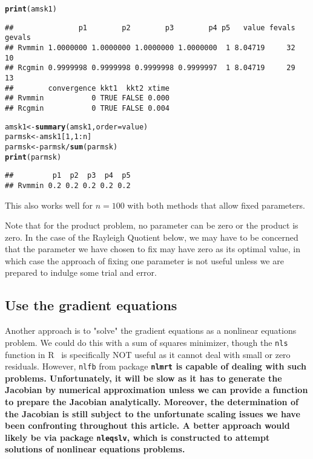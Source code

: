 \documentclass[11pt]{article}\usepackage[]{graphicx}\usepackage[]{color}
\makeatletter
\newcommand{\hlnum}[1]{\textcolor[rgb]{0.686,0.059,0.569}{#1}}%
\newcommand{\hlopt}[1]{\textcolor[rgb]{0,0,0}{#1}}%
\newcommand{\hlstd}[1]{\textcolor[rgb]{0.345,0.345,0.345}{#1}}%
\newcommand{\hlkwb}[1]{\textcolor[rgb]{0.69,0.353,0.396}{#1}}%
\newcommand{\hlkwc}[1]{\textcolor[rgb]{0.333,0.667,0.333}{#1}}%
\newcommand{\hlkwd}[1]{\textcolor[rgb]{0.737,0.353,0.396}{\textbf{#1}}}%
\newenvironment{kframe}{%
 \def\at@end@of@kframe{}%
 \ifinner\ifhmode%
  \def\at@end@of@kframe{\end{minipage}}%
  \begin{minipage}{\columnwidth}%
 \fi\fi%
 \def\FrameCommand##1{\hskip\@totalleftmargin \hskip-\fboxsep
 \colorbox{shadecolor}{##1}\hskip-\fboxsep
     \hskip-\linewidth \hskip-\@totalleftmargin \hskip\columnwidth}%
 \MakeFramed {\advance\hsize-\width
   \@totalleftmargin\z@ \linewidth\hsize
   \@setminipage}}%
 {\par\unskip\endMakeFramed%
 \at@end@of@kframe}
\newenvironment{knitrout}{}{} %
\newcommand{\R}{{\sf R }}
\newcommand{\code}[1]{{\tt#1}}
\newcommand{\pkg}[1]{\bf{\tt#1}\rm }
\makeatother
\begin{document}
\begin{knitrout}
\begin{kframe}
{\ttfamily\noindent\color{warningcolor}{\#\# Warning in bmchk(par, lower = lower, upper = upper): Masks (fixed parameters) set by bmchk due to tight bounds. CAUTION!!}}\begin{alltt}
\hlkwd{print}\hlstd{(amsk1)}
\end{alltt}
\begin{verbatim}
##               p1        p2        p3        p4 p5   value fevals gevals
## Rvmmin 1.0000000 1.0000000 1.0000000 1.0000000  1 8.04719     32     10
## Rcgmin 0.9999998 0.9999998 0.9999998 0.9999997  1 8.04719     29     13
##        convergence kkt1  kkt2 xtime
## Rvmmin           0 TRUE FALSE 0.000
## Rcgmin           0 TRUE FALSE 0.004
\end{verbatim}
\begin{alltt}
\hlstd{amsk1} \hlkwb{<-} \hlkwd{summary}\hlstd{(amsk1,} \hlkwc{order}\hlstd{=value)}
\hlstd{parmsk} \hlkwb{<-} \hlstd{amsk1[}\hlnum{1}\hlstd{,} \hlnum{1}\hlopt{:}\hlstd{n]}
\hlstd{parmsk} \hlkwb{<-} \hlstd{parmsk}\hlopt{/}\hlkwd{sum}\hlstd{(parmsk)}
\hlkwd{print}\hlstd{(parmsk)}
\end{alltt}
\begin{verbatim}
##         p1  p2  p3  p4  p5
## Rvmmin 0.2 0.2 0.2 0.2 0.2
\end{verbatim}
\end{kframe}
\end{knitrout}

This also works well for $n=100$ with both methods that allow fixed parameters.

Note that for the product problem, no parameter can be zero or the product is zero.
In the case of the Rayleigh Quotient below, we may have to be concerned that the
parameter we have chosen to fix may have zero as its optimal value, in which case
the approach of fixing one parameter is not useful unless we are prepared to 
indulge some trial and error. 

\subsection{Use the gradient equations}

Another approach is to "solve" the gradient equations as a nonlinear equations
problem. We could do this with 
a sum of squares minimizer, though the \code{nls} function in \R\ is 
specifically NOT useful as it cannot deal
with small or zero residuals. However, \code{nlfb} 
from package \pkg{nlmrt} is capable of dealing
with such problems. Unfortunately, it will be slow as it has to 
generate the Jacobian by numerical
approximation unless we can provide a function to prepare the 
Jacobian analytically. Moreover,
the determination of the Jacobian is still subject to 
the unfortunate scaling issues we have
been confronting throughout this article. A better approach
would likely be via package \code{nleqslv}, which is constructed
to attempt solutions of nonlinear equations problems. 
\end{document}
